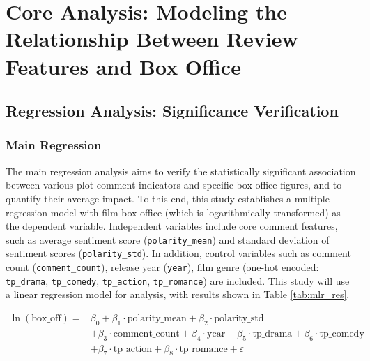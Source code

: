 \documentclass{article}
\begin{document}
\section{Core Analysis: Modeling the Relationship Between Review Features and Box Office}

\subsection{Regression Analysis: Significance Verification}

\subsubsection{Main Regression}
The main regression analysis aims to verify the statistically significant association between various plot comment indicators and specific box office figures, and to quantify their average impact. To this end, this study establishes a multiple regression model with film box office (which is logarithmically transformed) as the dependent variable. Independent variables include core comment features, such as average sentiment score (\texttt{polarity\_mean}) and standard deviation of sentiment scores (\texttt{polarity\_std}). In addition, control variables such as comment count (\texttt{comment\_count}), release year (\texttt{year}), film genre (one-hot encoded: \texttt{tp\_drama}, \texttt{tp\_comedy}, \texttt{tp\_action}, \texttt{tp\_romance}) are included. This study will use a linear regression model for analysis, with results shown in Table \ref{tab:mlr_res}.

\begin{equation}
\begin{split}
\ln(\text{box\_off}) = &\beta_0 + \beta_1 \cdot \text{polarity\_mean} + \beta_2 \cdot \text{polarity\_std} \\
& + \beta_3 \cdot \text{comment\_count} + \beta_4 \cdot \text{year} + \beta_5 \cdot \text{tp\_drama} + \beta_6 \cdot \text{tp\_comedy} \\
&+ \beta_7 \cdot \text{tp\_action} + \beta_8 \cdot \text{tp\_romance} + \varepsilon
\end{split}
\end{equation}
\end{document}
